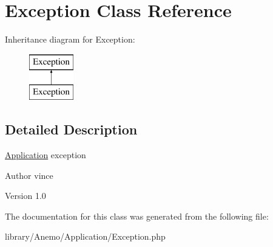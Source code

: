 \hypertarget{class_anemo_1_1_application_1_1_exception}{
\section{Exception Class Reference}
\label{class_anemo_1_1_application_1_1_exception}
}
Inheritance diagram for Exception:\begin{figure}[H]
\begin{center}
\leavevmode
\includegraphics[height=2.000000cm]{class_anemo_1_1_application_1_1_exception}
\end{center}
\end{figure}


\subsection{Detailed Description}
\hyperlink{class_anemo_1_1_application}{Application} exception \begin{DoxyAuthor}{Author}
vince 
\end{DoxyAuthor}
\begin{DoxyVersion}{Version}
1.0 
\end{DoxyVersion}


The documentation for this class was generated from the following file:\begin{DoxyCompactItemize}
\item 
library/Anemo/Application/Exception.php\end{DoxyCompactItemize}
